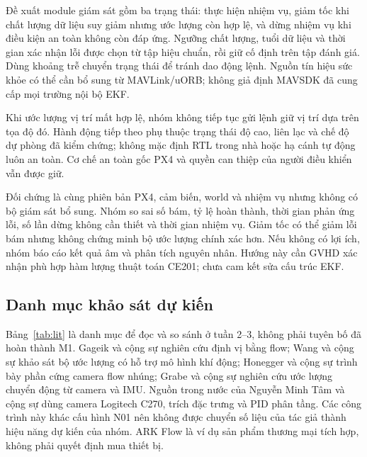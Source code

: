 \documentclass[a4paper,12pt]{article}
\begin{document}
Đề xuất module giám sát gồm ba trạng thái: thực hiện nhiệm vụ, giảm tốc khi chất lượng dữ liệu suy giảm nhưng ước lượng còn hợp lệ, và dừng nhiệm vụ khi điều kiện an toàn không còn đáp ứng. Ngưỡng chất lượng, tuổi dữ liệu và thời gian xác nhận lỗi được chọn từ tập hiệu chuẩn, rồi giữ cố định trên tập đánh giá. Dùng khoảng trễ chuyển trạng thái để tránh dao động lệnh. Nguồn tín hiệu sức khỏe có thể cần bổ sung từ MAVLink/uORB; không giả định MAVSDK đã cung cấp mọi trường nội bộ EKF.

Khi ước lượng vị trí mất hợp lệ, nhóm không tiếp tục gửi lệnh giữ vị trí dựa trên tọa độ đó. Hành động tiếp theo phụ thuộc trạng thái độ cao, liên lạc và chế độ dự phòng đã kiểm chứng; không mặc định RTL trong nhà hoặc hạ cánh tự động luôn an toàn. Cơ chế an toàn gốc PX4 và quyền can thiệp của người điều khiển vẫn được giữ.

Đối chứng là cùng phiên bản PX4, cảm biến, world và nhiệm vụ nhưng không có bộ giám sát bổ sung. Nhóm so sai số bám, tỷ lệ hoàn thành, thời gian phản ứng lỗi, số lần dừng không cần thiết và thời gian nhiệm vụ. Giảm tốc có thể giảm lỗi bám nhưng không chứng minh bộ ước lượng chính xác hơn. Nếu không có lợi ích, nhóm báo cáo kết quả âm và phân tích nguyên nhân. Hướng này cần GVHD xác nhận phù hợp hàm lượng thuật toán CE201; chưa cam kết sửa cấu trúc EKF.

\subsection{Danh mục khảo sát dự kiến}
Bảng~\ref{tab:lit} là danh mục để đọc và so sánh ở tuần 2–3, không phải tuyên bố đã hoàn thành M1. Gageik và cộng sự nghiên cứu định vị bằng flow\cite{gageik}; Wang và cộng sự khảo sát bộ ước lượng có hỗ trợ mô hình khí động\cite{wang}; Honegger và cộng sự trình bày phần cứng camera flow nhúng\cite{honegger}; Grabe và cộng sự nghiên cứu ước lượng chuyển động từ camera và IMU\cite{grabe}. Nguồn trong nước của Nguyễn Minh Tâm và cộng sự dùng camera Logitech C270, trích đặc trưng và PID phân tầng\cite{vn}. Các công trình này khác cấu hình N01 nên không được chuyển số liệu của tác giả thành hiệu năng dự kiến của nhóm. ARK Flow là ví dụ sản phẩm thương mại tích hợp, không phải quyết định mua thiết bị\cite{ark}.
\end{document}
